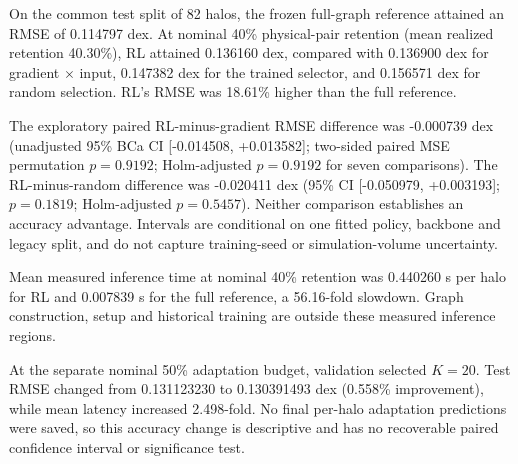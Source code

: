 On the common test split of 82 halos, the frozen full-graph reference attained
an RMSE of 0.114797 dex. At nominal 40\% physical-pair retention
(mean realized retention 40.30\%), RL attained
0.136160 dex, compared with 0.136900 dex for gradient $\times$ input,
0.147382 dex for the trained selector, and 0.156571 dex for random selection.
RL's RMSE was 18.61\% higher than the full reference.

The exploratory paired RL-minus-gradient RMSE difference was
-0.000739 dex (unadjusted 95\% BCa CI
[-0.014508, +0.013582]; two-sided paired MSE permutation
$p=0.9192$; Holm-adjusted $p=0.9192$ for seven comparisons).
The RL-minus-random difference was -0.020411 dex
(95\% CI [-0.050979, +0.003193]; $p=0.1819$;
Holm-adjusted $p=0.5457$). Neither comparison establishes an accuracy
advantage. Intervals are conditional on one fitted policy, backbone and legacy
split, and do not capture training-seed or simulation-volume uncertainty.

Mean measured inference time at nominal 40\% retention was
0.440260 s per halo for RL and 0.007839 s for the full
reference, a 56.16-fold slowdown. Graph construction,
setup and historical training are outside these measured inference regions.

At the separate nominal 50\% adaptation budget, validation selected $K=20$.
Test RMSE changed from 0.131123230 to 0.130391493 dex
(0.558\% improvement), while mean latency increased
2.498-fold. No final per-halo adaptation
predictions were saved, so this accuracy change is descriptive and has no
recoverable paired confidence interval or significance test.
